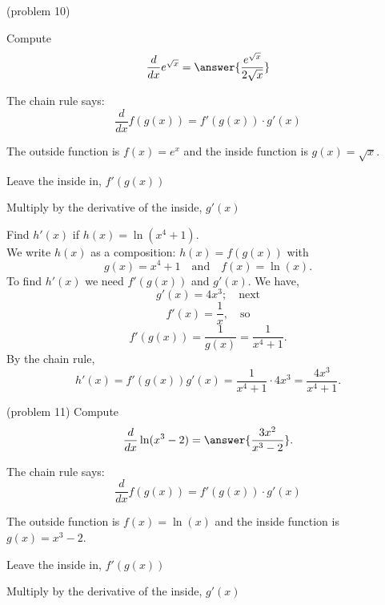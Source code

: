 \documentclass{ximera}
\begin{document}
\begin{problem}(problem 10)

Compute
  \[
  \frac{d}{dx} e^{\sqrt x} = \answer{\frac{e^{\sqrt x}}{2\sqrt x}}
  \]
  
    \begin{hint}
      The chain rule says:
      \[
      \frac{d}{dx} f(g(x)) = f'(g(x))\cdot g'(x)
      \]
    \end{hint}
    \begin{hint}
      The outside function is $f(x) = e^x$ and the inside
      function is $g(x) = \sqrt x$.
    \end{hint}
    \begin{hint}
		  Leave the inside in, $f'(g(x))$
		\end{hint}
		\begin{hint}
		  Multiply by the derivative of the inside, $g'(x)$
		\end{hint}
		
\end{problem}



\begin{example}[example 11]
Find $h'(x)$ if $h(x) = \ln(x^4 +1)$.\\
We write $h(x)$ as a composition: $h(x)=f(g(x))$ with 
\[g(x) = x^4 + 1  \quad \text{and} \quad  f(x) = \ln(x).\]
 To find $h'(x)$ we need $f'(g(x))$ and $g'(x)$.  We have, 
\[g'(x) = 4x^3; \quad \text{next} \] 
\[f'(x) = \frac{1}{x}, \quad \text{so}\]
\[ f'(g(x)) =\frac{1}{g(x)} = \frac{1}{x^4 + 1} .\]
By the chain rule,
\[h'(x) = f'(g(x))g'(x) = \frac{1}{x^4 + 1} \cdot 4x^3 = \frac{4x^3}{x^4 + 1}.\]
\end{example}

\begin{center}
\begin{foldable}
\end{foldable}
\end{center}
 


\begin{problem}(problem 11)
  Compute
  \[
  \frac{d}{dx} \ln(x^3 -2) = \answer{\frac{3x^2}{x^3 - 2}}.
  \]
  
    \begin{hint}
      The chain rule says:
      \[
      \frac{d}{dx} f(g(x)) = f'(g(x))\cdot g'(x)
      \]
    \end{hint}
    \begin{hint}
      The outside function is $f(x) = \ln(x)$ and the inside
      function is $g(x) = x^3 - 2$.
    \end{hint}
    \begin{hint}
		  Leave the inside in, $f'(g(x))$
		\end{hint}
		\begin{hint}
		  Multiply by the derivative of the inside, $g'(x)$
		\end{hint}
		
\end{problem}
\end{document}
